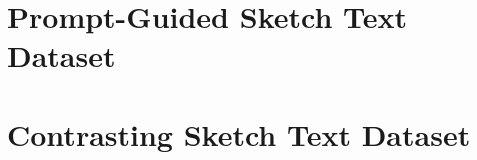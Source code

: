

\section{Prompt-Guided Sketch Text Dataset} \label{datav1}


\newpage
\section{Contrasting Sketch Text Dataset} \label{datav2}


